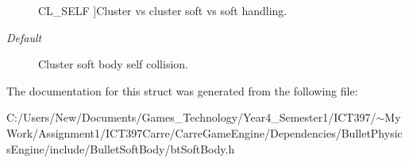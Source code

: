 \begin{Desc}
\begin{description}
{\hypertarget{structbt_soft_body_1_1f_collision_feb40bef0380b8db7e9e5628cc5f08d571505ee64a4a976707c73ec67cfcd533}{
CL\_\-SELF}
\label{structbt_soft_body_1_1f_collision_feb40bef0380b8db7e9e5628cc5f08d571505ee64a4a976707c73ec67cfcd533}
}]Cluster vs cluster soft vs soft handling. \item[{\em 
\hypertarget{structbt_soft_body_1_1f_collision_feb40bef0380b8db7e9e5628cc5f08d51c6fb7a4f36642982c053815889133e5}{
Default}
\label{structbt_soft_body_1_1f_collision_feb40bef0380b8db7e9e5628cc5f08d51c6fb7a4f36642982c053815889133e5}
}]Cluster soft body self collision. \end{description}
\end{Desc}



The documentation for this struct was generated from the following file:\begin{CompactItemize}
\item 
C:/Users/New/Documents/Games\_\-Technology/Year4\_\-Semester1/ICT397/$\sim$My Work/Assignment1/ICT397Carre/CarreGameEngine/Dependencies/BulletPhysicsEngine/include/BulletSoftBody/btSoftBody.h\end{CompactItemize}
